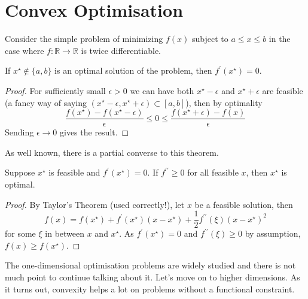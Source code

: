 \section{Convex Optimisation}
Consider the simple problem of minimizing $f(x)$ subject to $a\le x\le b$ in the case where $f:\mathbb R\to\mathbb R$ is twice differentiable.
\begin{theorem}
    If $x^\star\notin \{a,b\}$ is an optimal solution of the problem, then $f^\prime(x^\star)=0$.
\end{theorem}
\begin{proof}
    For sufficiently small $\epsilon>0$ we can have both $x^\star-\epsilon$ and $x^\star+\epsilon$ are feasible (a fancy way of saying $(x^\star-\epsilon,x^\star+\epsilon)\subset [a,b]$), then by optimality
    $$\frac{f(x^\star)-f(x^\star-\epsilon)}{\epsilon}\le0\le\frac{f(x^\star+\epsilon)-f(x)}{\epsilon}$$
    Sending $\epsilon\to0$ gives the result.
\end{proof}
As well known, there is a partial converse to this theorem.
\begin{theorem}
    Suppose $x^\star$ is feasible and $f^\prime(x^\star)=0$.
    If $f^{\prime\prime}\ge 0$ for all feasible $x$, then $x^\star$ is optimal.
\end{theorem}
\begin{proof}
    By Taylor's Theorem (used correctly!), let $x$ be a feasible solution, then
    $$f(x)=f(x^\star)+f^\prime(x^\star)(x-x^\star)+\frac{1}{2}f^{\prime\prime}(\xi)(x-x^\star)^2$$
    for some $\xi$ in between $x$ and $x^\star$.
    As $f^\prime(x^\star)=0$ and $f^{\prime\prime}(\xi)\ge 0$ by assumption, $f(x)\ge f(x^\star)$.
\end{proof}
The one-dimensional optimisation problems are widely studied and there is not much point to continue talking about it.
Let's move on to higher dimensions.
As it turns out, convexity helps a lot on problems without a functional constraint.
